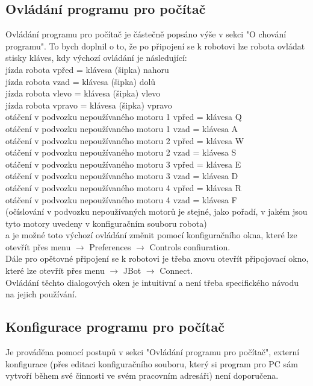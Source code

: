 \documentclass[12pt, ngerman]{article}
\begin{document}
\subsection{Ovládání programu pro počítač}
Ovládání programu pro počítač je částečně popsáno výše v sekci "O chování programu". To bych doplnil o to, že po připojení se k robotovi lze robota ovládat stisky kláves, kdy výchozí ovládání je následující:\\

jízda robota vpřed = klávesa (šipka) nahoru\\
jízda robota vzad = klávesa (šipka) dolů\\
jízda robota vlevo = klávesa (šipka) vlevo\\
jízda robota vpravo = klávesa (šipka) vpravo \\
otáčení v podvozku nepoužívaného motoru 1 vpřed = klávesa Q\\
otáčení v podvozku nepoužívaného motoru 1 vzad = klávesa A\\
otáčení v podvozku nepoužívaného motoru 2 vpřed = klávesa W\\
otáčení v podvozku nepoužívaného motoru 2 vzad = klávesa S\\
otáčení v podvozku nepoužívaného motoru 3 vpřed = klávesa E\\
otáčení v podvozku nepoužívaného motoru 3 vzad = klávesa D\\
otáčení v podvozku nepoužívaného motoru 4 vpřed = klávesa R\\
otáčení v podvozku nepoužívaného motoru 4 vzad = klávesa F\\
(očíslování v podvozku nepoužívaných motorů je stejné, jako pořadí, v jakém jsou tyto motory uvedeny v konfiguračním souboru robota)\\

a je možné toto výchozí ovládání změnit pomocí konfiguračního okna, které lze otevřít přes menu $\rightarrow$ Preferences $\rightarrow$ Controls confiuration.\\
Dále pro opětovné připojení se k robotovi je třeba znovu otevřít připojovací okno, které lze otevřít přes menu $\rightarrow$ JBot $\rightarrow$ Connect.\\
Ovládání těchto dialogových oken je intuitivní a není třeba specifického návodu na jejich používání.

\subsection{Konfigurace programu pro počítač}
Je prováděna pomocí postupů v sekci "Ovládání programu pro počítač", externí konfigurace (přes editaci konfiguračního souboru, který si program pro PC sám vytvoří během své činnosti ve svém pracovním adresáři) není doporučena.
\end{document}
